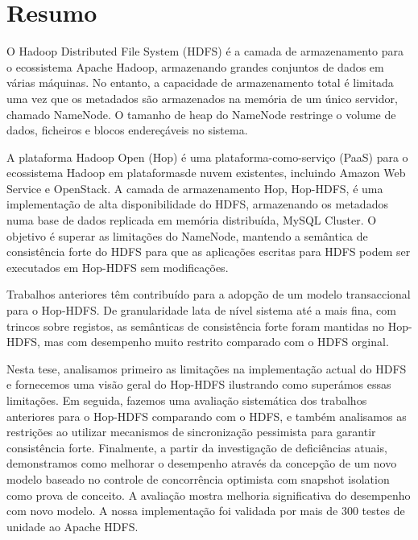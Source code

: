 \chapter*{Resumo}
\thispagestyle{empty}

O Hadoop Distributed File System (HDFS) é a camada de armazenamento para o ecossistema Apache Hadoop, armazenando grandes conjuntos de dados em várias máquinas. No entanto, a capacidade de armazenamento total é limitada uma vez que os metadados são armazenados na memória de um único servidor, chamado NameNode. O  tamanho de heap do NameNode restringe o volume de dados,  ficheiros e blocos endereçáveis ​​no sistema.

\noindent A plataforma Hadoop Open (Hop) é uma plataforma-como-serviço (PaaS) para o ecossistema Hadoop em plataformasde nuvem existentes, incluindo Amazon Web Service e OpenStack.  A camada de armazenamento Hop, Hop-HDFS, é uma implementação de alta disponibilidade do HDFS, armazenando os metadados numa base de dados replicada em memória distribuída, MySQL Cluster. O objetivo é superar as limitações do NameNode, mantendo a semântica de consistência forte do HDFS para que as aplicações escritas para HDFS podem ser executados em Hop-HDFS sem modificações.

\noindent Trabalhos anteriores têm contribuído para a adopção de um modelo transaccional para o Hop-HDFS. De granularidade lata de nível sistema até a mais fina, com trincos sobre registos, as semânticas de consistência forte foram mantidas no Hop-HDFS, mas com desempenho muito restrito comparado com o HDFS orginal.

\noindent Nesta tese, analisamos primeiro as limitações na implementação actual do HDFS e fornecemos uma visão geral do Hop-HDFS ilustrando como superámos essas limitações. Em seguida, fazemos uma avaliação sistemática dos trabalhos anteriores para o Hop-HDFS comparando com o HDFS, e também analisamos as restrições ao utilizar mecanismos de sincronização pessimista para garantir consistência forte. Finalmente, a partir da investigação de deficiências atuais, demonstramos como melhorar o desempenho através da concepção de um novo modelo baseado no controle de concorrência optimista com snapshot isolation como prova de conceito. A avaliação mostra melhoria significativa do desempenho com novo modelo. A nossa implementação foi validada por mais de 300 testes de unidade ao Apache HDFS.

\newpage


